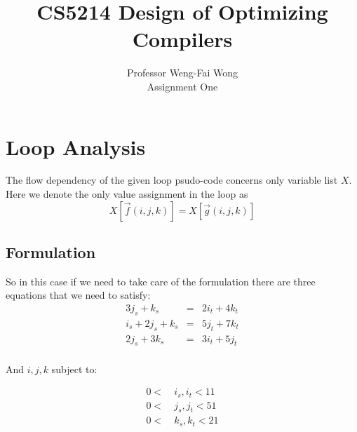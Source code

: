 \documentclass[12pt]{article}
\begin{document}

\newcommand{\ijk}{(i, j, k)}

\title{CS5214 Design of Optimizing Compilers }%
\author{Professor Weng-Fai Wong\\ %
Assignment One} %

\maketitle






\section{Loop Analysis}
The flow dependency of the given loop psudo-code concerns only
variable list $X$. Here we denote the only value assignment in the
loop as
$$X[\vec{f}\ijk] = X[\vec{g}\ijk]$$

\subsection{Formulation}
So in this case if we need to take care of the formulation there are
three equations that we need to satisfy:
\begin{equation}
\begin{aligned}
3j_s + k_s &= & 2i_t +4k_t\\
i_s + 2j_s + k_s &= & 5j_t + 7k_t\\
2j_s + 3k_s &= & 3i_t + 5j_t\\
\end{aligned}
\end{equation}

And $i, j, k$ subject to:

\begin{equation}
\begin{aligned}
0 < & ~i_s, i_t< 11\\
0 < & ~j_s, j_t< 51\\
0 < & ~k_s, k_t< 21
\end{aligned}
\end{equation}
\end{document}
